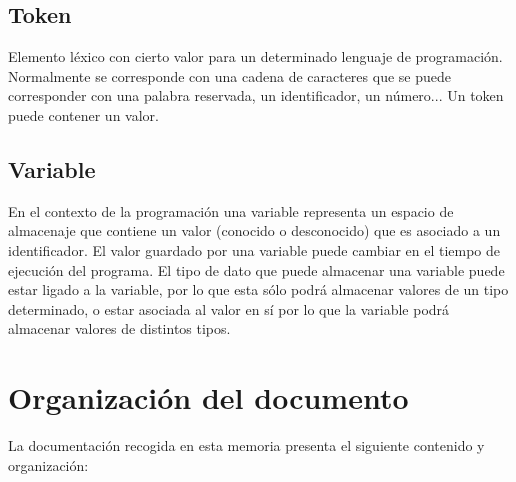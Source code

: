 \subsection{Token}
Elemento léxico con cierto valor para un determinado lenguaje de programación. Normalmente se corresponde con una cadena de
caracteres que se puede corresponder con una palabra reservada, un identificador, un número... Un token puede contener un 
valor.

\subsection{Variable}
En el contexto de la programación una variable representa un espacio de almacenaje que contiene un valor (conocido o desconocido) que es asociado a un identificador.
El valor guardado por una variable puede cambiar en el tiempo de ejecución del programa. El tipo de dato que puede almacenar una variable puede estar ligado a la 
variable, por lo que esta sólo podrá almacenar valores de un tipo determinado, o estar asociada al valor en sí por lo que la variable podrá almacenar valores de 
distintos tipos.

\section{Organización del documento}
La documentación recogida en esta memoria presenta el siguiente contenido y organización:

